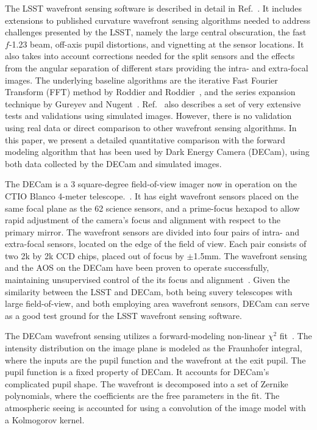 \documentclass[]{spie}  %
\begin{document}
The LSST wavefront sensing software is described in detail in Ref.~.
It includes extensions to published curvature wavefront sensing algorithms needed
to address challenges presented by the LSST, namely the large central
obscuration, the fast $f$-1.23 beam, off-axis pupil distortions, and vignetting
at the sensor locations. It also takes into account corrections needed for the
split sensors and the effects from the angular separation of different
stars providing the intra- and extra-focal images.
The underlying baseline algorithms are the iterative Fast Fourier 
Transform (FFT) method by Roddier and Roddier~\cite{Roddier93}, and
the series expansion technique by Gureyev and Nugent~\cite{GuNu96}.
Ref.~ also describes a set of very extensive tests and validations using simulated images.
However, there is no validation using real data or direct comparison to other wavefront sensing algorithms. In this paper, we present a detailed quantitative comparison with the forward modeling algorithm that has been used by Dark Energy Camera (DECam), using both data collected by the DECam and simulated images.

The DECam is a 3 square-degree field-of-view imager now in operation on the CTIO Blanco 4-meter telescope.~\cite{DECamStatus}. It has eight wavefront sensors placed on the same focal plane as the 62 science sensors, and a prime-focus hexapod to allow rapid adjustment of the camera's focus and alignment with respect to the primary mirror.
The wavefront sensors are divided into four pairs of intra- and extra-focal sensors, located on the edge of the field of view. Each pair consists of two 2k by 2k CCD chips, placed out of focus by $\pm$1.5mm.
The wavefront sensing and the AOS on the DECam have been proven to operate successfully, maintaining unsupervised control of the its focus and alignment~\cite{roodman14}.
Given the similarity between the LSST and DECam, both being suvery telescopes with large field-of-view, and both employing area wavefront sensors, DECam can serve as a good test ground for the LSST wavefront sensing software. 

The DECam wavefront sensing utilizes a forward-modeling non-linear $\chi^2$ fit~\cite{roodman14}. The intensity distribution on the image plane is modeled as the Fraunhofer integral, where the inputs are the pupil function and the wavefront at the exit pupil. The pupil function is a fixed property of DECam. It accounts for DECam's complicated pupil shape. The wavefront is decomposed into a set of Zernike polynomials, where the coefficients are the free parameters in the fit. The atmospheric seeing is accounted for using a convolution of the image model with a Kolmogorov kernel.
\end{document}
